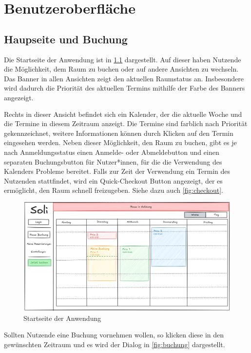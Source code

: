 
\chapter{Benutzeroberfläche}
\label{chap:ui}

\section{Haupseite und Buchung}

Die Startseite der Anwendung ist in \ref{fig:startseite} dargestellt.
Auf dieser haben Nutzende die Möglichkeit, dem Raum zu buchen oder auf andere Ansichten zu wechseln.
Das Banner in allen Ansichten zeigt den aktuellen Raumstatus an.
Insbesondere wird dadurch die Priorität des aktuellen Termins mithilfe der Farbe des Banners angezeigt.

Rechts in dieser Ansicht befindet sich ein Kalender, der die aktuelle Woche und die Termine in diesem Zeitraum anzeigt.
Die Termine sind farblich nach Priorität gekennzeichnet, weitere Informationen können durch Klicken auf den Termin eingesehen werden.
Neben dieser Möglichkeit, den Raum zu buchen, gibt es je nach Anmeldungsstatus einen Anmelde- oder Abmeldebutton und einen separaten Buchungsbutton für Nutzer*innen,
für die die Verwendung des Kalenders Probleme bereitet.
Falls zur Zeit der Verwendung ein Termin des Nutzenden stattfindet, wird ein Quick-Checkout Button angezeigt,
der es ermöglicht, den Raum schnell freizugeben.
Siehe dazu auch \ref{fig:checkout}.
\clearpage
\begin{figure}[ht]
    \centering
    \includegraphics[scale=0.15]{figures/ui/startseite}
    \caption{Startseite der Anwendung}
    \label{fig:startseite}
\end{figure}

Sollten Nutzende eine Buchung vornehmen wollen, so klicken diese in den gewünschten Zeitraum
und es wird der Dialog in \ref{fig:buchung} dargestellt.

